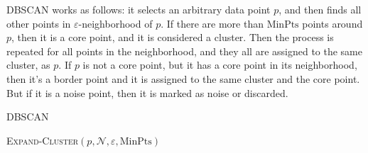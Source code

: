 DBSCAN works as follows: it selects an arbitrary data point $p$, and then 
finds all other points in $\varepsilon$-neighborhood of $p$. If 
there are more than $\text{MinPts}$ points around $p$, then it is a core point, 
and it is considered a cluster. Then the process is repeated for all points in 
the neighborhood, and they all are assigned to the same cluster, as $p$. 
If $p$ is not a core point, but it has a core point in its neighborhood, then 
it's a border point and it is assigned to the same cluster and the core point.
But if it is a noise point, then it is marked as noise or discarded. 


\begin{algorithm}
\caption{DBSCAN}
\label{algo:dbscan}

\begin{algorithmic}[0]
  \Statex

      \EndIf
      \Else
            {\textsc{Expand-Cluster}$(p, \mathcal N, \varepsilon, \text{MinPts})$}
      \EndIf
    \EndFor
    \State {}
  \EndFunction
\end{algorithmic}


\begin{algorithmic}[0]
  \Statex
        \EndIf

        \EndIf

     \EndFor

     \State {}
  \EndFunction
\end{algorithmic}

\begin{algorithmic}[0]
  \Statex
     \State {} 
  \EndFunction
\end{algorithmic}

\end{algorithm}


